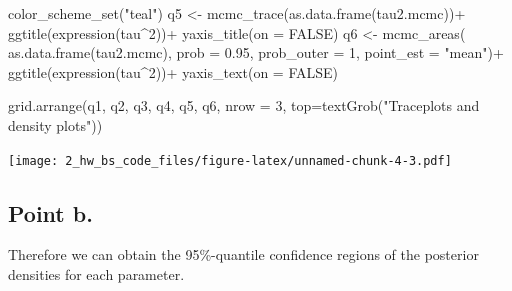 \documentclass[
  11pt,
]{article}
\newenvironment{Shaded}{\begin{snugshade}}{\end{snugshade}}
\newcommand{\AttributeTok}[1]{\textcolor[rgb]{0.77,0.63,0.00}{#1}}
\newcommand{\CommentTok}[1]{\textcolor[rgb]{0.56,0.35,0.01}{\textit{#1}}}
\newcommand{\ConstantTok}[1]{\textcolor[rgb]{0.00,0.00,0.00}{#1}}
\newcommand{\DecValTok}[1]{\textcolor[rgb]{0.00,0.00,0.81}{#1}}
\newcommand{\FloatTok}[1]{\textcolor[rgb]{0.00,0.00,0.81}{#1}}
\newcommand{\FunctionTok}[1]{\textcolor[rgb]{0.00,0.00,0.00}{#1}}
\newcommand{\NormalTok}[1]{#1}
\newcommand{\OtherTok}[1]{\textcolor[rgb]{0.56,0.35,0.01}{#1}}
\newcommand{\SpecialCharTok}[1]{\textcolor[rgb]{0.00,0.00,0.00}{#1}}
\newcommand{\StringTok}[1]{\textcolor[rgb]{0.31,0.60,0.02}{#1}}
\begin{document}
\begin{Shaded}
\begin{Highlighting}[]
\FunctionTok{color\_scheme\_set}\NormalTok{(}\StringTok{"teal"}\NormalTok{)}
\NormalTok{q5 }\OtherTok{\textless{}{-}} \FunctionTok{mcmc\_trace}\NormalTok{(}\FunctionTok{as.data.frame}\NormalTok{(tau2.mcmc))}\SpecialCharTok{+}
  \FunctionTok{ggtitle}\NormalTok{(}\FunctionTok{expression}\NormalTok{(tau}\SpecialCharTok{\^{}}\DecValTok{2}\NormalTok{))}\SpecialCharTok{+}
  \FunctionTok{yaxis\_title}\NormalTok{(}\AttributeTok{on =} \ConstantTok{FALSE}\NormalTok{)}
\NormalTok{q6 }\OtherTok{\textless{}{-}} \FunctionTok{mcmc\_areas}\NormalTok{(}
  \FunctionTok{as.data.frame}\NormalTok{(tau2.mcmc), }
  \AttributeTok{prob =} \FloatTok{0.95}\NormalTok{, }
  \AttributeTok{prob\_outer =} \DecValTok{1}\NormalTok{, }
  \AttributeTok{point\_est =} \StringTok{"mean"}\NormalTok{)}\SpecialCharTok{+}
  \FunctionTok{ggtitle}\NormalTok{(}\FunctionTok{expression}\NormalTok{(tau}\SpecialCharTok{\^{}}\DecValTok{2}\NormalTok{))}\SpecialCharTok{+}
  \FunctionTok{yaxis\_text}\NormalTok{(}\AttributeTok{on =} \ConstantTok{FALSE}\NormalTok{)}

\FunctionTok{grid.arrange}\NormalTok{(q1, q2, q3, q4, q5, q6, }\AttributeTok{nrow =} \DecValTok{3}\NormalTok{, }\AttributeTok{top=}\FunctionTok{textGrob}\NormalTok{(}\StringTok{"Traceplots and density plots"}\NormalTok{))}
\end{Highlighting}
\end{Shaded}

\texttt{[image: 2\_hw\_bs\_code\_files/figure-latex/unnamed-chunk-4-3.pdf]}
\normalsize

\hypertarget{point-b.-1}{%
\subsection{Point b.}\label{point-b.-1}}

Therefore we can obtain the 95\%-quantile confidence regions of the
posterior densities for each parameter.

\scriptsize

\begin{Shaded}
\end{Shaded}
\end{document}

